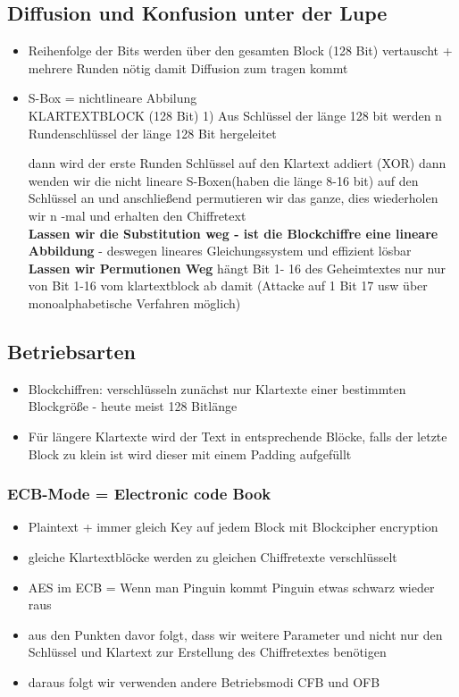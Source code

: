 \documentclass[a4paper,10pt]{scrartcl}
\begin{document}
  
   \subsection{Diffusion und Konfusion unter der Lupe}
   
   \begin{itemize}
    \item Reihenfolge der Bits werden über den gesamten Block (128 Bit) vertauscht + mehrere Runden nötig damit Diffusion zum tragen kommt
    \item S-Box = nichtlineare Abbilung\\
    KLARTEXTBLOCK (128 Bit)                             1) Aus Schlüssel der länge 128 bit werden n Rundenschlüssel der länge 128 Bit hergeleitet
    
    dann wird der erste Runden Schlüssel auf den Klartext addiert (XOR) dann wenden wir die nicht lineare S-Boxen(haben die länge 8-16 bit) auf den Schlüssel an und anschließend permutieren wir das ganze,
    dies wiederholen wir n -mal und erhalten den Chiffretext\\
    \textbf{Lassen wir die Substitution weg - ist die Blockchiffre eine lineare Abbildung} - deswegen lineares Gleichungssystem und effizient lösbar\\
    \textbf{Lassen wir Permutionen Weg} hängt Bit 1- 16 des Geheimtextes nur nur von Bit 1-16 vom klartextblock ab damit (Attacke auf 1 Bit 17 usw über monoalphabetische
    Verfahren möglich)
    \end{itemize}
    \subsection{Betriebsarten}
   \begin{itemize}
    \item Blockchiffren: verschlüsseln zunächst nur Klartexte einer bestimmten Blockgröße - heute meist 128 Bitlänge
    \item Für längere Klartexte wird der Text in entsprechende Blöcke, falls der letzte Block zu klein ist wird dieser mit einem Padding aufgefüllt
   \end{itemize}

   \subsubsection{ECB-Mode = Electronic code Book}
   \begin{itemize}
    \item Plaintext + immer gleich Key auf jedem Block mit Blockcipher encryption
    \item gleiche Klartextblöcke werden zu gleichen Chiffretexte verschlüsselt
    \item AES im ECB = Wenn man Pinguin kommt Pinguin etwas schwarz wieder raus
    \item aus den Punkten davor folgt, dass wir weitere Parameter und nicht nur den Schlüssel und Klartext zur Erstellung des Chiffretextes benötigen
    \item daraus folgt wir verwenden andere Betriebsmodi CFB und OFB
   \end{itemize}
   
\end{document}
